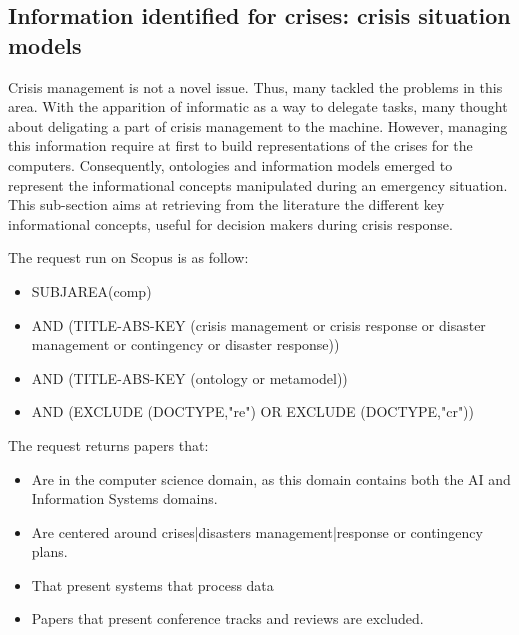 \subsection{Information identified for crises: crisis situation models}
Crisis management is not a novel issue.
Thus, many tackled the problems in this area.
With the apparition of informatic as a way to delegate tasks, many thought about deligating a part of crisis management to the machine.
However, managing this information require at first to build representations of the crises for the computers.
Consequently, ontologies and information models emerged to represent the informational concepts manipulated during an emergency situation.
This sub-section aims at retrieving from the literature the different key informational concepts, useful for decision makers during crisis response.

The request run on Scopus is as follow:
\begin{itemize}
    \item SUBJAREA(comp)
    \item AND (TITLE-ABS-KEY ({crisis management} or {crisis response} or {disaster management} or contingency or {disaster response}))
    \item AND (TITLE-ABS-KEY (ontology or metamodel))
    \item AND (EXCLUDE (DOCTYPE,"re") OR EXCLUDE (DOCTYPE,"cr"))
\end{itemize}

The request returns papers that:
\begin{itemize}
    \item Are in the computer science domain, as this domain contains both the AI and Information Systems domains.
    \item Are centered around crises|disasters management|response or contingency plans.
    \item That present systems that process data
    \item Papers that present conference tracks and reviews are excluded.
\end{itemize}

